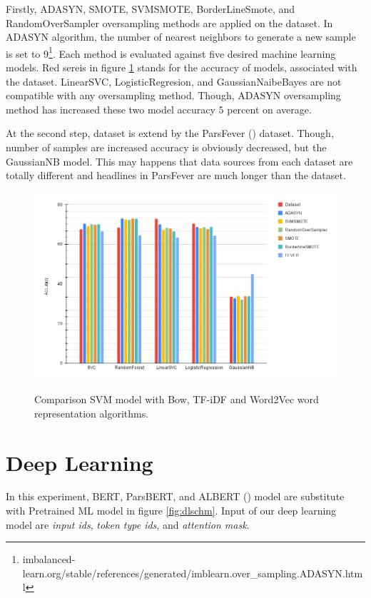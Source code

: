 Firstly, ADASYN, SMOTE, SVMSMOTE, BorderLineSmote, and RandomOverSampler oversampling methods are applied on the \cite{stance_persian} dataset. In ADASYN algorithm, the number of nearest neighbors to generate a new sample is set to 9\footnote{imbalanced-learn.org/stable/references/generated/imblearn.over\_sampling.ADASYN.html}. Each method is evaluated against five desired machine learning models. Red sereis in figure \ref{fig:balanc} stands for the accuracy of models, associated with the \cite{stance_persian} dataset. LinearSVC, LogisticRegresion, and GaussianNaibeBayes are not compatible with any oversampling method. Though, ADASYN oversampling method has increased these two model accuracy $5$ percent on average.


At the second step, dataset is extend by the ParsFever (\cite{parsfever}) dataset. Though, number of samples are increased accuracy is obviously decreased, but the GaussianNB model. This may happens that data sources from each dataset are totally different and headlines in ParsFever are much longer than the \cite{stance_persian} dataset.
\begin{figure}%
	\centering
	{\includegraphics[width=14.5cm]{statistics/balancing.png} }
	\caption{Comparison SVM model with Bow, TF-iDF and Word2Vec word representation algorithms.}%
	\label{fig:balanc}%
\end{figure}

\section{Deep Learning}
In this experiment, BERT, ParsBERT, and ALBERT (\cite{albert}) model are substitute with Pretrained ML model in figure \ref{fig:dlschm}. Input of our deep learning model are \textit{input ids}, \textit{token type ids}, and \textit{attention mask}.


